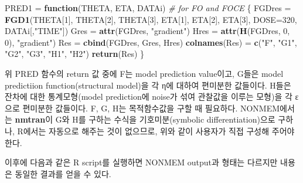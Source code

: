 \documentclass[
  11pt,
  krantz2, a4paper, twoside]{krantz}
\newenvironment{Shaded}{\begin{snugshade}}{\end{snugshade}}
\newcommand{\CommentTok}[1]{\textcolor[rgb]{0.56,0.35,0.01}{\textit{#1}}}
\newcommand{\ControlFlowTok}[1]{\textcolor[rgb]{0.13,0.29,0.53}{\textbf{#1}}}
\newcommand{\DataTypeTok}[1]{\textcolor[rgb]{0.13,0.29,0.53}{#1}}
\newcommand{\DecValTok}[1]{\textcolor[rgb]{0.00,0.00,0.81}{#1}}
\newcommand{\KeywordTok}[1]{\textcolor[rgb]{0.13,0.29,0.53}{\textbf{#1}}}
\newcommand{\NormalTok}[1]{#1}
\newcommand{\StringTok}[1]{\textcolor[rgb]{0.31,0.60,0.02}{#1}}
\theoremstyle{definition}
\theoremstyle{definition}
\theoremstyle{definition}
\theoremstyle{remark}
\begin{document}
\begin{Shaded}
\begin{Highlighting}[]
\NormalTok{PRED1 =}\StringTok{ }\ControlFlowTok{function}\NormalTok{(THETA, ETA, DATAi)  }\CommentTok{\# for FO and FOCE}
\NormalTok{\{}
\NormalTok{  FGDres =}\StringTok{ }\KeywordTok{FGD1}\NormalTok{(THETA[}\DecValTok{1}\NormalTok{], THETA[}\DecValTok{2}\NormalTok{], THETA[}\DecValTok{3}\NormalTok{], ETA[}\DecValTok{1}\NormalTok{], ETA[}\DecValTok{2}\NormalTok{], ETA[}\DecValTok{3}\NormalTok{], }
                \DataTypeTok{DOSE=}\DecValTok{320}\NormalTok{, DATAi[,}\StringTok{"TIME"}\NormalTok{])}
\NormalTok{  Gres =}\StringTok{ }\KeywordTok{attr}\NormalTok{(FGDres, }\StringTok{"gradient"}\NormalTok{)}
\NormalTok{  Hres =}\StringTok{ }\KeywordTok{attr}\NormalTok{(}\KeywordTok{H}\NormalTok{(FGDres, }\DecValTok{0}\NormalTok{, }\DecValTok{0}\NormalTok{), }\StringTok{"gradient"}\NormalTok{)}
\NormalTok{  Res =}\StringTok{ }\KeywordTok{cbind}\NormalTok{(FGDres, Gres, Hres)}
  \KeywordTok{colnames}\NormalTok{(Res) =}\StringTok{ }\KeywordTok{c}\NormalTok{(}\StringTok{"F"}\NormalTok{, }\StringTok{"G1"}\NormalTok{, }\StringTok{"G2"}\NormalTok{, }\StringTok{"G3"}\NormalTok{, }\StringTok{"H1"}\NormalTok{, }\StringTok{"H2"}\NormalTok{)}
  \KeywordTok{return}\NormalTok{(Res)}
\NormalTok{\}}
\end{Highlighting}
\end{Shaded}

\normalsize


위 PRED 함수의 return 값 중에 F는 model prediction value이고, G들은 model predictiion function(structural model)을 각 η에 대하여 편미분한 값들이다. H들은 잔차에 대한 통계모형(model prediction에 noise가 섞여 관찰값을 이루는 모형)을 각 ε으로 편미분한 값들이다. F, G, H는 목적함수값을 구할 때 필요하다. NONMEM에서는 \textbf{nmtran}이 G와 H를 구하는 수식을 기호미분(symbolic differentiation)으로 구하나, R에서는 자동으로 해주는 것이 없으므로, 위와 같이 사용자가 직접 구성해 주어야 한다.

이후에 다음과 같은 R script를 실행하면 NONMEM output과 형태는 다르지만 내용은 동일한 결과를 얻을 수 있다.
\small
\end{document}
